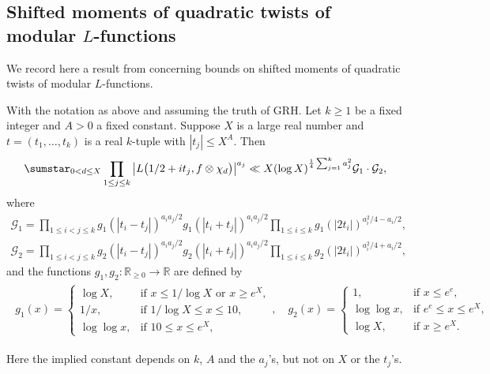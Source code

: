 \documentclass[twoside,leqno,10pt, A4]{amsart}
\begin{document}
\subsection{Shifted moments of quadratic twists of modular $L$-functions }
  We record here a result from
\cite{G&Zhao24-12} concerning bounds on shifted moments of quadratic twists of modular $L$-functions.
\begin{proposition}\label{prop}
With the notation as above and assuming the truth of GRH. Let $k\geq 1$ be a fixed integer and $A>0$ a fixed constant. Suppose $X$ is a large real number and $t=(t_1,\dots,t_k)$ is a real $k$-tuple with $|t_j|\leq X^A$. Then
\begin{align*}
  \sumstar_{0<d \leq X}\prod_{1\leq j\leq k}\big| L\big(1/2+it_j,f \otimes \chi_d \big) \big|^{a_j}
 \ll  X(\log X)^{\frac{1}{4}\sum_{j=1}^k a_j^2}  \mathcal{G}_1\cdot\mathcal{G}_2,
\end{align*}
where
\begin{align*}
\mathcal{G}_1=\prod_{1\leq i<j\leq k} g_1(|t_i-t_j|)^{a_ia_j/2}g_1(|t_i+t_j|)^{a_ia_j/2}\prod_{1\leq i\leq k} g_1(|2t_i|)^{a^2_i/4-a_i/2},
\end{align*}
\begin{align*}
\mathcal{G}_2=\prod_{1\leq i<j\leq k} g_2(|t_i-t_j|)^{a_ia_j/2}g_2(|t_i+t_j|)^{a_ia_j/2}\prod_{1\leq i\leq k} g_2(|2t_i|)^{a^2_i/4+a_i/2},
\end{align*}
and the functions $g_1, g_2 : \mathbb{R}_{\geq 0} \rightarrow \mathbb{R}$ are defined by
\begin{align}
\label{g1Def}
\begin{split}
g_1(x) =\begin{cases}
\log X,  & \text{if } x\leq 1/\log X \text{ or } x \geq e^X, \\
1/x, & \text{if }   1/\log X \leq x\leq 10, \\
\log \log x, & \text{if }  10 \leq x \leq e^{X},
\end{cases},
\quad
g_2(x) =
\begin{cases}
1,  & \text{if } x \leq e^e, \\
\log \log x, & \text{if }   e^e \leq x \leq e^{X}, \\
 \log X, & \text{if }  x \geq e^{X}.
\end{cases}
\end{split}
\end{align}

 Here the implied constant depends on $k$, $A$ and the $a_j$'s, but not on $X$ or the $t_j$'s.
\end{proposition}
\end{document}
